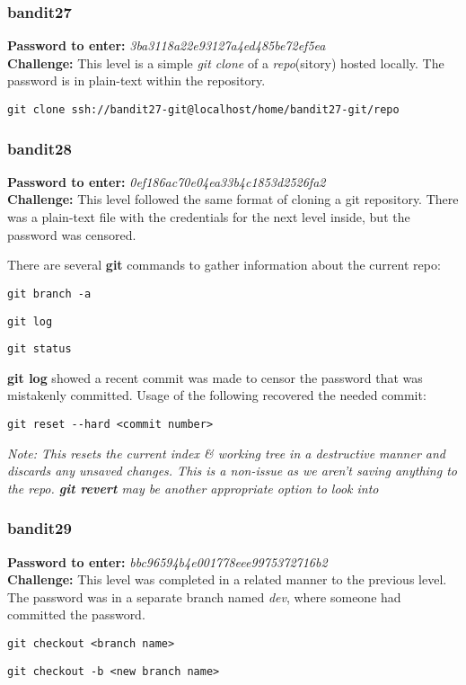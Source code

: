 \documentclass[a4paper]{article}
\newcommand{\pass}[1]{\textbf{Password to enter:} \textit{#1}\\}
\newcommand{\chall}{\textbf{Challenge:} }
\begin{document}
\subsubsection{bandit27}
\pass{3ba3118a22e93127a4ed485be72ef5ea}
\chall This level is a simple \textit{git clone} of a \textit{repo}(sitory) hosted locally. The password is in plain-text within the repository.
\begin{lstlisting}[deletekeywords={ssh}]
git clone ssh://bandit27-git@localhost/home/bandit27-git/repo
\end{lstlisting}

\subsubsection{bandit28}
\pass{0ef186ac70e04ea33b4c1853d2526fa2}
\chall This level followed the same format of cloning a git repository. There was a plain-text file with the credentials for the next level inside, but the password was censored.

There are several \textbf{git} commands to gather information about the current repo:
\begin{lstlisting}[title=list all local \& remote branches]
git branch -a
\end{lstlisting}
\begin{lstlisting}[title=show the commit history]
git log
\end{lstlisting}
\begin{lstlisting}[title=show your local status\, compared to the repository]
git status
\end{lstlisting}

\textbf{git log} showed a recent commit was made to censor the password that was mistakenly committed.
Usage of the following recovered the needed commit:
\begin{lstlisting}
git reset --hard <commit number>
\end{lstlisting}
\textit{Note: This resets the current index \& working tree in a destructive manner and discards any unsaved changes. This is a non-issue as we aren't saving anything to the repo. \textbf{git revert} may be another appropriate option to look into}

\subsubsection{bandit29}
\pass{bbc96594b4e001778eee9975372716b2}
\chall This level was completed in a related manner to the previous level. The password was in a separate branch named \textit{dev}, where someone had committed the password.
\begin{lstlisting}[title=change to a different branch]
git checkout <branch name>
\end{lstlisting}
\begin{lstlisting}[title=change to a \textbf{new} branch]
git checkout -b <new branch name>
\end{lstlisting}
\end{document}
